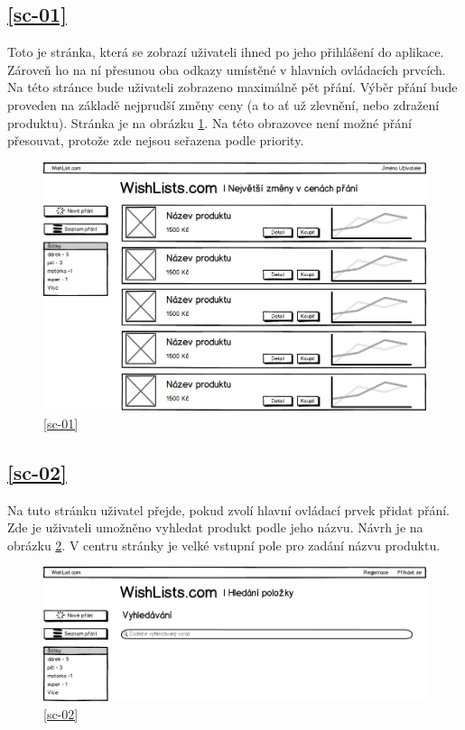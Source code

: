 \subsection{\ref{sc-01}}
Toto je stránka, která se zobrazí uživateli ihned po jeho přihlášení do aplikace. Zároveň ho na ní přesunou oba odkazy umístěné v hlavních ovládacích prvcích. Na této stránce bude uživateli zobrazeno maximálně pět přání. Výběr přání bude proveden na základě nejprudší změny ceny (a to ať už zlevnění, nebo zdražení produktu). Stránka je na obrázku \ref{fig:uvodni-prihlaseny-uzivatel}. Na této obrazovce není možné přání přesouvat, protože zde nejsou seřazena podle priority.

\begin{figure}[htb]
\begin{center}
\includegraphics[width=130mm]{./pictures/mock/uvodni-prihlaseny-uzivatel.png}
\caption{\ref{sc-01}}
\label{fig:uvodni-prihlaseny-uzivatel}
\end{center}
\end{figure}

\subsection{\ref{sc-02}}
Na tuto stránku uživatel přejde, pokud zvolí hlavní ovládací prvek přidat přání. Zde je uživateli umožněno vyhledat produkt podle jeho názvu. Návrh je na obrázku \ref{fig:vyhledavani}. V centru stránky je velké vstupní pole pro zadání názvu produktu.

\begin{figure}[htb]
\begin{center}
\includegraphics[width=130mm]{./pictures/mock/vyhledavani.png}
\caption{\ref{sc-02}}
\label{fig:vyhledavani}
\end{center}
\end{figure}

